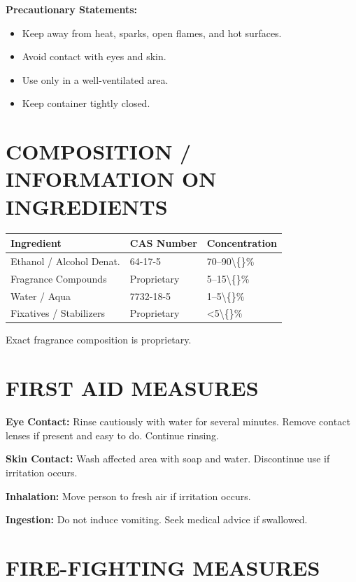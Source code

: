 \documentclass[11pt]{article}
\begin{document}
\textbf{Precautionary Statements:}
\begin{itemize}[noitemsep]
    \item Keep away from heat, sparks, open flames, and hot surfaces.
    \item Avoid contact with eyes and skin.
    \item Use only in a well-ventilated area.
    \item Keep container tightly closed.
\end{itemize}

\section{COMPOSITION / INFORMATION ON INGREDIENTS}

\begin{longtable}{|p{2.3in}|p{1.5in}|p{1.5in}|}
\hline
\textbf{Ingredient} & \textbf{CAS Number} & \textbf{Concentration} \\
\hline
Ethanol / Alcohol Denat. & 64-17-5 & 70--90\textbackslash\{\}\% \\
Fragrance Compounds & Proprietary & 5--15\textbackslash\{\}\% \\
Water / Aqua & 7732-18-5 & 1--5\textbackslash\{\}\% \\
Fixatives / Stabilizers & Proprietary & <5\textbackslash\{\}\% \\
\hline
\end{longtable}

Exact fragrance composition is proprietary.

\section{FIRST AID MEASURES}

\textbf{Eye Contact:} Rinse cautiously with water for several minutes. Remove contact lenses if present and easy to do. Continue rinsing.

\textbf{Skin Contact:} Wash affected area with soap and water. Discontinue use if irritation occurs.

\textbf{Inhalation:} Move person to fresh air if irritation occurs.

\textbf{Ingestion:} Do not induce vomiting. Seek medical advice if swallowed.

\section{FIRE-FIGHTING MEASURES}
\end{document}
